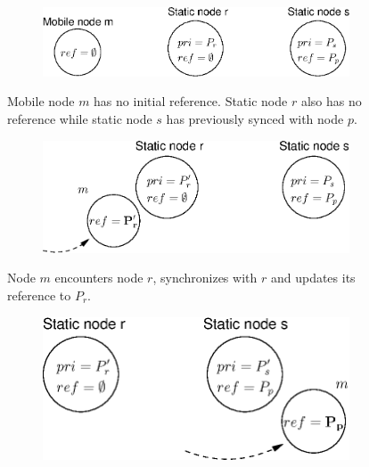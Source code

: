 \documentclass[twoside,twocolumn]{article}
\begin{document}
\begin{figure}[t]
   \centering
   \begin{subfigure}
       \centering
       \includegraphics[scale=0.35]{figs/illustration-1}
   \end{subfigure}
      \parbox{.8\columnwidth}
      {\smallskip\scriptsize
      Mobile node $m$ has no initial reference. Static node $r$ also
      has no reference while static node $s$ has previously
      synced with node $p$.\\}
  \begin{subfigure}
      \centering
      \includegraphics[scale=0.35]{figs/illustration-2}
  \end{subfigure}
      \parbox{.8\columnwidth}
      {\smallskip\scriptsize
      Node $m$ encounters node $r$, synchronizes with $r$ and
      updates its reference to $P_r$.\\}
  \begin{subfigure}
      \centering
      \includegraphics[scale=0.35]{figs/illustration-3}
  \end{subfigure}
      \parbox{.8\columnwidth}
      {\smallskip\scriptsize
}
\end{figure}
\end{document}
